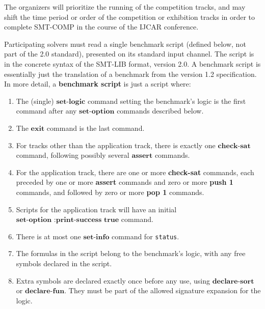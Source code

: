 \documentclass[12pt]{article}
\newcommand{\akey}[1]{\textbf{#1}}
\begin{document}
The organizers will prioritize the running of the competition tracks, and may shift the
time period or order of the competition or exhibition tracks in order to complete SMT-COMP
in the course of the IJCAR conference.

%
Participating solvers must read a single benchmark script (defined
below, not part of the 2.0 standard), presented on its standard input
channel. The script is in the concrete syntax of the SMT-LIB format,
version 2.0.  A benchmark script is essentially just the translation
of a benchmark from the version 1.2 specification.  In more detail, a
\textbf{benchmark script} is just a script where:

\begin{enumerate}
\item The (single) $\akey{set-logic}$ command setting the benchmark's
logic is the first command after any $\akey{set-option}$ commands described below.
\item The $\akey{exit}$ command is the last command.
\item For tracks other than the application track, there is exactly one $\akey{check-sat}$ command,
following possibly several $\akey{assert}$ commands.
\item For the application track, there are one or more \akey{check-sat} commands, 
  each preceded by one or more \akey{assert} commands 
  and zero or more \akey{push 1} commands, 
  and followed by zero or more \akey{pop 1} commands.
\item Scripts for the application track will have an initial $\akey{set-option :print-success true}$ command.
\item There is at most one $\akey{set-info}$ command for \texttt{status}.
\item The formulas in the script belong to the benchmark's logic, with
any free symbols declared in the script.
\item Extra symbols are declared exactly once before any
  use, using $\akey{declare-sort}$
  or $\akey{declare-fun}$.
  They must be part of the allowed signature expansion for the logic.

\end{enumerate}
\end{document}
